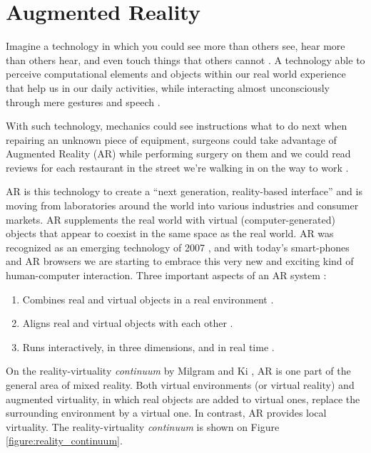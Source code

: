 

\section{Augmented Reality} %
\label{sec:basic_concepts:augmented_reality}

Imagine a technology in which you could see more than others see, hear more than others hear, and even touch things that others cannot \cite{Krevelen2010}. A technology able to perceive computational elements and objects within our real world experience that help us in our daily activities, while interacting almost unconsciously through mere gestures and speech \cite{Krevelen2010,Teichrieb2007}.

With such technology, mechanics could see instructions what to do next when repairing an unknown piece of equipment, surgeons could take advantage of Augmented Reality (AR) while performing surgery on them and we could read reviews for each restaurant in the street we're walking in on the way to work \cite{Krevelen2010}.

AR is this technology to create a ``next generation, reality-based interface'' \cite{Krevelen2010} and is moving from laboratories around the world into various industries and consumer markets. AR supplements the real world with virtual (computer-generated) objects that appear to coexist in the same space as the real world. AR was recognized as an emerging technology of 2007 \cite{Krevelen2010}, and with today's smart-phones and AR browsers we are starting to embrace this very new and exciting kind of human-computer interaction. Three important aspects of an AR system \cite{Krevelen2010,Benford1998}:

\begin{enumerate}
  \item Combines real and virtual objects in a real environment \cite{Krevelen2010,Benford1998}.
  \item Aligns real and virtual objects with each other \cite{Krevelen2010,Benford1998}.
  \item Runs interactively, in three dimensions, and in real time \cite{Krevelen2010,Benford1998}.
\end{enumerate}

On the reality-virtuality \textit{continuum} by Milgram and Ki \cite{Mistry2009}, AR is one part of the general area of mixed reality. Both virtual environments (or virtual reality) and augmented virtuality, in which real objects are added to virtual ones, replace the surrounding environment by a virtual one. In contrast, AR provides local virtuality. The reality-virtuality \textit{continuum} is shown on Figure \ref{figure:reality_continuum}.


